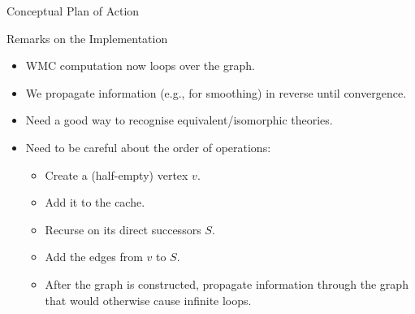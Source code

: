 \documentclass{beamer}
\begin{document}
\begin{frame}{Conceptual Plan of Action}
  \centering
\end{frame}

\begin{frame}{Remarks on the Implementation}
  \begin{itemize}
  \item WMC computation now loops over the graph.
  \item We propagate information (e.g., for smoothing) in reverse until convergence.
  \item Need a good way to recognise equivalent/isomorphic theories.
  \item Need to be careful about the order of operations:
    \begin{itemize}
    \item Create a (half-empty) vertex $v$.
    \item Add it to the cache.
    \item Recurse on its direct successors $S$.
    \item Add the edges from $v$ to $S$.
    \item After the graph is constructed, propagate information through the
      graph that would otherwise cause infinite loops.
    \end{itemize}
  \end{itemize}
\end{frame}
\end{document}

